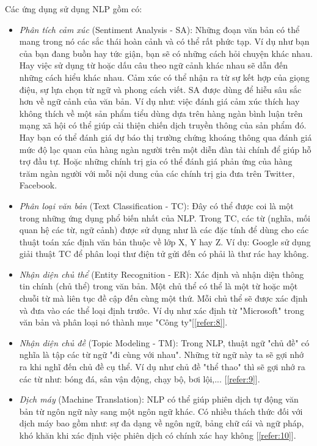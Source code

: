 Các ứng dụng sử dụng NLP gồm có:
\begin{itemize}
    \item \emph{Phân tích cảm xúc} (Sentiment Analysis - SA): Những đoạn văn bản có thể mang trong nó các sắc thái hoàn cảnh và có thể rất phức tạp. Ví dụ như bạn của bạn đang buồn hay tức giận, bạn sẽ có những cách hỏi chuyện khác nhau. Hay việc sử dụng từ hoặc dấu câu theo ngữ cảnh khác nhau sẽ dẫn đến những cách hiểu khác nhau. Cảm xúc có thể nhận ra từ sự kết hợp của giọng điệu, sự lựa chọn từ ngữ và phong cách viết. SA được dùng để hiễu sâu sắc hơn về ngữ cảnh của văn bản. Ví dụ như: việc đánh giá cảm xúc thích hay không thích về một sản phẩm tiểu dùng dựa trên hàng ngàn bình luận trên mạng xã hội có thể giúp cải thiện chiến dịch truyền thông của sản phẩm đó. Hay bạn có thể đánh giá dự báo thị trường chứng khoáng thông qua đánh giá mức độ lạc quan của hàng ngàn người trên một diễn đàn tài chính để giúp hỗ trợ đầu tự. Hoặc những chính trị gia có thể đánh giá phản ứng của hàng trăm ngàn người với mỗi nội dung của các chính trị gia đưa trên Twitter, Facebook.
    \item \emph{Phân loại văn bản} (Text Classification - TC): Đây có thể được coi là một trong những ứng dụng phổ biến nhất của NLP. Trong TC, các từ (nghĩa, mối quan hệ các từ, ngữ cảnh) được sử dụng như là các đặc tính để dùng cho các thuật toán xác định văn bản thuộc về lớp X, Y hay Z. Ví dụ: Google sử dụng giải thuật TC để phân loại thư điện tử gửi đến có phải là thư rác hay không.
    \item \emph{Nhận diện chủ thể} (Entity Recognition - ER): Xác định và nhận diện thông tin chính (chủ thể) trong văn bản. Một chủ thể có thể là một từ hoặc một chuỗi từ mà liên tục đề cập đến cùng một thứ. Mỗi chủ thể sẽ được xác định và đưa vào các thể loại định trước. Ví dụ như xác định từ "Microsoft" trong văn bản và phân loại nó thành mục "Công ty"[\ref{refer:8}]. 
    \item \emph{Nhận diện chủ đề} (Topic Modeling - TM): Trong NLP, thuật ngữ "chủ đề" có nghĩa là tập các từ ngữ "đi cùng với nhau". Những từ ngữ này ta sẽ gợi nhớ ra khi nghĩ đến chủ đề cụ thể. Ví dụ như chủ đề "thể thao" thì sẽ gợi nhớ ra các từ như: bóng đá, sân vận động, chạy bộ, bơi lội,... [\ref{refer:9}].
    \item \emph{Dịch máy} (Machine Translation): NLP có thể giúp phiên dịch tự động văn bản từ ngôn ngữ này sang một ngôn ngữ khác. Có nhiều thách thức đối với dịch máy bao gồm như: sự đa dạng về ngôn ngữ, bảng chữ cái và ngữ pháp, khó khăn khi xác định việc phiên dịch có chính xác hay không [\ref{refer:10}].

\end{itemize}
